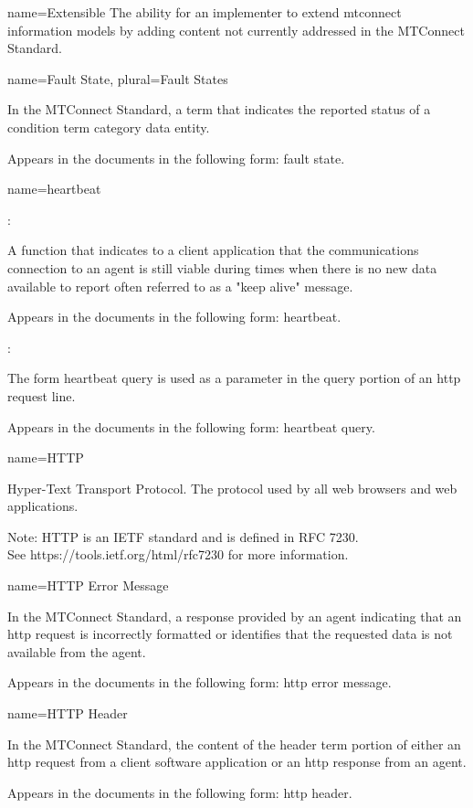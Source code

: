 {
  name={Extensible}
}
{
	The ability for an implementer to extend \glspl{mtconnect information model} by adding content not currently addressed in the MTConnect Standard.
}


{
  name={Fault State},
  plural={Fault States}
}
{
	In the MTConnect Standard, a term that indicates the reported status of a \gls{condition term} category \gls{data entity}.   

	Appears in the documents in the following form: \gls{fault state}.
}


{
  name={heartbeat}
}
{
	:

	A function that indicates to a client application that the communications connection to an \gls{agent} is still viable during times when there is no new data available to report  often referred to as a "keep alive" message.

	Appears in the documents in the following form: \gls{heartbeat}.

	:

	The form \gls{heartbeat query} is used as a parameter in the query portion of an \gls{http request line}.

	Appears in the documents in the following form: \gls{heartbeat query}.
}


{
  name={\normalfont HTTP}
}
{
	Hyper-Text Transport Protocol.  The protocol used by all web browsers and web applications.

    \begin{note}
	Note:  HTTP is an IETF standard and is defined in RFC 7230. \\ See https://tools.ietf.org/html/rfc7230 for more information.
	\end{note}
}


{
  name={HTTP Error Message}
}
{
	In the MTConnect Standard, a response provided by an \gls{agent} indicating that an \gls{http request} is incorrectly formatted or identifies that the requested data is not available from the \gls{agent}.  

	Appears in the documents in the following form: \gls{http error message}.
}


{
  name={HTTP Header}
}
{
	In the MTConnect Standard, the content of the \gls{header term} portion of either an \gls{http request} from a client software application or an \gls{http response} from an \gls{agent}.

	Appears in the documents in the following form: \gls{http header}.
}


